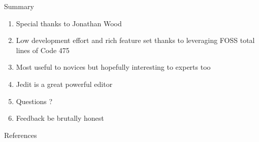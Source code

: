 \documentclass{beamer}
\begin{document}
\begin{frame}{Summary}
\begin{enumerate}
\item Special thanks to Jonathan Wood
\item Low development effort and rich feature set thanks to leveraging FOSS total lines of Code 475
\item Most useful to novices but hopefully interesting to experts too
\item Jedit is a great powerful editor
\item Questions ?
\item Feedback be brutally honest
\end{enumerate}
\end{frame}

\begin{frame}[allowframebreaks]{References}


\end{frame}
\end{document}

